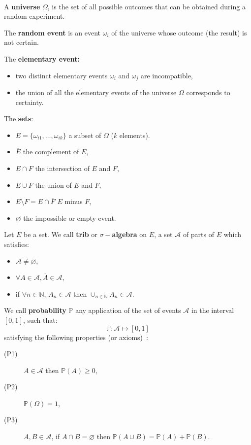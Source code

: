 
\begin{f}[Axiomatic]{\ }
	
	A \textbf{universe} \(\Omega\), is the set of all possible outcomes that can be obtained during a random experiment.
	
	The \textbf{random event} is an event \(\omega_i\) of the universe whose outcome (the result) is not certain.
	
	
	The \textbf{elementary event:}
	\begin{itemize}
		\item two distinct elementary events \(\omega_i\) and \(\omega_j\) are incompatible,
		\item the union of all the elementary events of the universe \(\Omega \) corresponds to certainty.
	\end{itemize}
	
	The \textbf{sets}:
	\begin{itemize}
		\item \(E=\lbrace \omega_{i1},\ldots , \omega_{ik}\rbrace\) a subset of \(\Omega\) (\(k\) elements).
		\item \(\overline{E}\) the complement of \(E\),
		\item \(E\cap F\) the intersection of \(E\) and \(F\),
		\item \(E\cup F\) the union of \(E\) and \(F\),
		\item \(E\setminus F= E\cap\overline{F}\) \(E\) minus \(F\),
		\item \(\varnothing\) the impossible or empty event.
	\end{itemize}
	
	Let \(E\) be a set. We call \textbf{trib} or \textbf{\(\sigma-\)algebra} on \(E\), a set \(\mathcal{A}\) of parts of \(E\) which satisfies:
	\begin{itemize}
		\item     \(\mathcal{A} \not=\varnothing\),
		\item     \(\forall A \in \mathcal{A} , \overline{A} \in\mathcal{A}\),
		\item     if \(\forall n \in \mathbb{N}\), \(A_n \in\mathcal{A}\) then \(\cup_{n\in\mathbb{N} } A_n \in\mathcal{A}\).
	\end{itemize}
	
	We call \textbf{probability} \(\mathbb{P}\) any application of the set of events \(\mathcal{A}\) in the interval \([0,1]\), such that:      \[\mathbb{P}:      \mathcal{A}  \mapsto   [0,1]\]
	satisfying the following properties (or axioms)~:
	\begin{description}
		\item[(P1)] \(A \in  \mathcal{A} \)    then  \( \mathbb{P}(A) \geq 0\),
		\item[(P2)] \( \mathbb{P}(\Omega) = 1\),
		\item[(P3)] \(A, B \in  \mathcal{A}\),  if  \(A\cap B =\varnothing\)    then   \(\mathbb{P}(A\cup B)=\mathbb{P}(A) + \mathbb{P}(B)\).
	\end{description}
	

\end{f}
